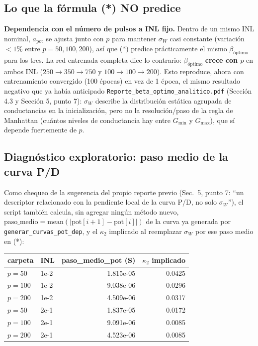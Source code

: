 \documentclass[11pt]{article}
\begin{document}
\subsection{Lo que la fórmula (*) NO predice}

\textbf{Dependencia con el número de pulsos a INL fijo.} Dentro de un mismo
INL nominal, $a_{\mathrm{pot}}$ se ajusta junto con $p$ para mantener
$\sigma_W$ casi constante (variación $<1\%$ entre $p=50,100,200$), así que
(*) predice prácticamente el mismo $\beta_{\text{óptimo}}$ para los tres.
La red entrenada completa dice lo contrario: $\beta_{\text{óptimo}}$
\textbf{crece con $p$} en ambos INL ($250\to350\to750$ y $100\to100\to200$).
Esto reproduce, ahora con entrenamiento convergido (100 épocas) en vez de 1
época, el mismo resultado negativo que ya había anticipado
\texttt{Reporte\_beta\_optimo\_analitico.pdf} (Sección 4.3 y Sección 5,
punto 7): $\sigma_W$ describe la distribución estática agrupada de
conductancias en la inicialización, pero no la resolución/paso de la regla
de Manhattan (cuántos niveles de conductancia hay entre $G_{\min}$ y
$G_{\max}$), que sí depende fuertemente de $p$.

\subsection{Diagnóstico exploratorio: paso medio de la curva P/D}

Como chequeo de la sugerencia del propio reporte previo (Sec.\ 5, punto 7:
``un descriptor relacionado con la pendiente local de la curva P/D, no solo
$\sigma_W$''), el script también calcula, sin agregar ningún método nuevo,
$\text{paso\_medio}=\mathrm{mean}(|\mathrm{pot}[i{+}1]-\mathrm{pot}[i]|)$ de
la curva ya generada por \texttt{generar\_curvas\_pot\_dep}, y el $\kappa_2$
implicado al reemplazar $\sigma_W$ por ese paso medio en (*):

\begin{table}[htbp]
\centering
\small
\begin{tabular}{@{}llrr@{}}
\toprule
carpeta & INL & paso\_medio\_pot (S) & $\kappa_2$ implicado \\
\midrule
$p=50$  & 1e-2 & 1.815e-05 & 0.0425 \\
$p=100$ & 1e-2 & 9.038e-06 & 0.0296 \\
$p=200$ & 1e-2 & 4.509e-06 & 0.0317 \\
$p=50$  & 2e-1 & 1.837e-05 & 0.0172 \\
$p=100$ & 2e-1 & 9.091e-06 & 0.0085 \\
$p=200$ & 2e-1 & 4.523e-06 & 0.0085 \\
\bottomrule
\end{tabular}
\end{table}
\end{document}
